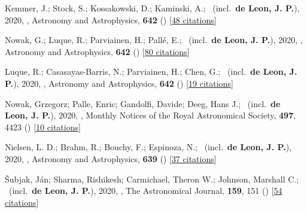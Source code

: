 \item[{\color{numcolor}\scriptsize28}] Kemmer, J.; Stock, S.; Kossakowski, D.; Kaminski, A.; \etal\ (incl.\ \textbf{de Leon, J. P.}), 2020, , Astronomy and Astrophysics, \textbf{642} () [\href{https://ui.adsabs.harvard.edu/abs/2020A&A...642A.236K}{48 citations}]

\item[{\color{numcolor}\scriptsize27}] Nowak, G.; Luque, R.; Parviainen, H.; Pall{\'e}, E.; \etal\ (incl.\ \textbf{de Leon, J. P.}), 2020, , Astronomy and Astrophysics, \textbf{642} () [\href{https://ui.adsabs.harvard.edu/abs/2020A&A...642A.173N}{80 citations}]

\item[{\color{numcolor}\scriptsize26}] Luque, R.; Casasayas-Barris, N.; Parviainen, H.; Chen, G.; \etal\ (incl.\ \textbf{de Leon, J. P.}), 2020, , Astronomy and Astrophysics, \textbf{642} () [\href{https://ui.adsabs.harvard.edu/abs/2020A&A...642A..50L}{19 citations}]

\item[{\color{numcolor}\scriptsize25}] Nowak, Grzegorz; Palle, Enric; Gandolfi, Davide; Deeg, Hans J.; \etal\ (incl.\ \textbf{de Leon, J. P.}), 2020, , Monthly Notices of the Royal Astronomical Society, \textbf{497}, 4423 () [\href{https://ui.adsabs.harvard.edu/abs/2020MNRAS.497.4423N}{10 citations}]

\item[{\color{numcolor}\scriptsize24}] Nielsen, L. D.; Brahm, R.; Bouchy, F.; Espinoza, N.; \etal\ (incl.\ \textbf{de Leon, J. P.}), 2020, , Astronomy and Astrophysics, \textbf{639} () [\href{https://ui.adsabs.harvard.edu/abs/2020A&A...639A..76N}{37 citations}]

\item[{\color{numcolor}\scriptsize23}] {\v{S}}ubjak, J{\'a}n; Sharma, Rishikesh; Carmichael, Theron W.; Johnson, Marshall C.; \etal\ (incl.\ \textbf{de Leon, J. P.}), 2020, , The Astronomical Journal, \textbf{159}, 151 () [\href{https://ui.adsabs.harvard.edu/abs/2020AJ....159..151S}{54 citations}]

